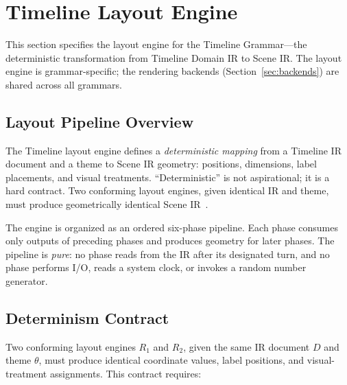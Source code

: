 \section{Timeline Layout Engine}
\label{sec:timeline-rendering}

This section specifies the layout engine for the Timeline Grammar---the deterministic transformation from Timeline Domain IR to Scene IR. The layout engine is grammar-specific; the rendering backends (Section~\ref{sec:backends}) are shared across all grammars.

\subsection{Layout Pipeline Overview}

The Timeline layout engine defines a \emph{deterministic mapping} from a Timeline IR document and a
theme to Scene IR geometry: positions, dimensions, label placements, and visual
treatments. ``Deterministic'' is not aspirational; it is a hard contract. Two conforming
layout engines, given identical IR and theme, must produce geometrically identical Scene IR~\cite{vegalite2017}.

The engine is organized as an ordered six-phase pipeline. Each phase consumes only outputs
of preceding phases and produces geometry for later phases. The pipeline is \emph{pure}: no
phase reads from the IR after its designated turn, and no phase performs I/O, reads a system
clock, or invokes a random number generator.

\subsection{Determinism Contract}
\label{sec:rendering-determinism}

Two conforming layout engines $R_1$ and $R_2$, given the same IR document $D$ and theme $\theta$,
must produce identical coordinate values, label positions, and visual-treatment assignments.
This contract requires:

